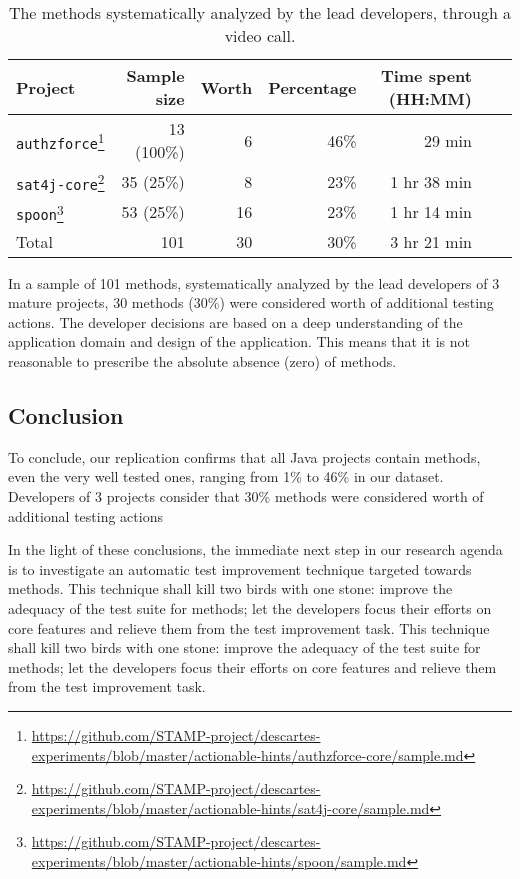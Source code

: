 \begin{table}
	\caption{The \pseudotested{} methods systematically analyzed by the lead developers, through a video call.}
	\label{tab:todevelopers}
	\centering
	\begin{tabular}{lrrrrrr}
		\toprule
		Project             & Sample size & Worth & Percentage  & Time spent (HH:MM)  \\
		\midrule
		\texttt{authzforce}\footnote{\url{https://github.com/STAMP-project/descartes-experiments/blob/master/actionable-hints/authzforce-core/sample.md}} &  13 (100\%) &                    6 &        46\% & 29 min              \\  
		\texttt{sat4j-core}\footnote{\url{https://github.com/STAMP-project/descartes-experiments/blob/master/actionable-hints/sat4j-core/sample.md}} &  35  (25\%) &                    8 &        23\% & 1 hr 38 min         \\
		\texttt{spoon}\footnote{\url{https://github.com/STAMP-project/descartes-experiments/blob/master/actionable-hints/spoon/sample.md}}      &  53  (25\%) &                   16 &        23\% & 1 hr 14 min         \\
		\midrule
		Total               & 101         &                   30 &        30\% & 3 hr 21 min         \\
		\bottomrule
	\end{tabular}
\end{table}

In a sample of 101 \pseudotested{} methods, systematically analyzed by the lead developers of 3 mature projects, 30 methods (30\%) were considered worth of additional testing actions. 
The developer decisions are based on a deep understanding of the application domain and design of the application. 
This means that it is not reasonable to prescribe the absolute absence (zero) of \pseudotested{} methods.

\subsection{Conclusion}
\label{subsec:transversal-contributions:descartes:conclusion}

To conclude, our replication confirms that all Java projects contain \pseudotested{} methods, even the very well tested ones, ranging from 1\% to 46\% in our dataset.
Developers of 3 projects consider that 30\% methods were considered worth of additional testing actions

In the light of these conclusions, the immediate next step in our research agenda is to investigate an automatic test improvement technique targeted towards \pseudotested{} methods.
This technique shall kill two birds with one stone: improve the adequacy of the test suite for \pseudotested{} methods; 
let the developers focus their efforts on core features and relieve them from the test improvement task.
This technique shall kill two birds with one stone: improve the adequacy of the test suite for \pseudotested{} methods; let the developers focus their efforts on core features and relieve them from the test improvement task.

